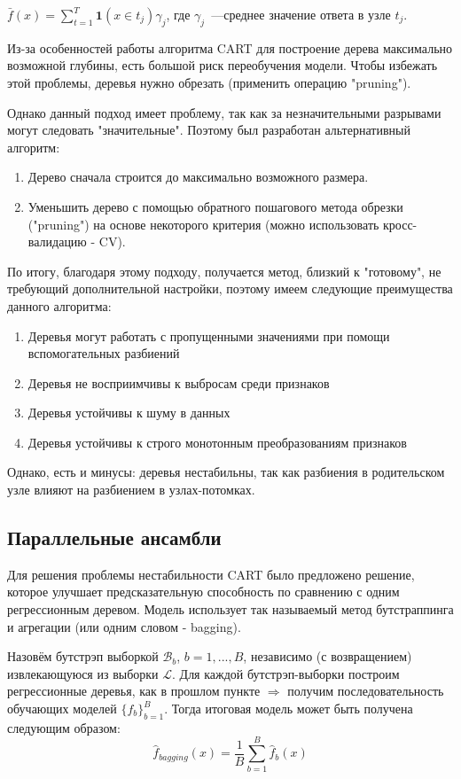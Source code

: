 \begin{center}   
$\bar{f}(x) = \sum_{t=1}^T \mathbf{1}(x \in t_j)\gamma_j$, где $\gamma_j$~---среднее значение ответа в узле $t_j$.
\end{center}

Из-за особенностей работы алгоритма CART для построение дерева максимально возможной глубины, есть большой риск переобучения модели. Чтобы избежать этой проблемы, деревья нужно обрезать (применить операцию "pruning").

Однако данный подход имеет проблему, так как за незначительными разрывами могут следовать "значительные". Поэтому был разработан альтернативный алгоритм:
\begin{enumerate}
    \item Дерево сначала строится до максимально возможного размера.
    \item Уменьшить дерево с помощью обратного пошагового метода обрезки ("pruning") на основе некоторого критерия (можно использовать кросс-валидацию - CV).
\end{enumerate}

По итогу, благодаря этому подходу, получается метод, близкий к "готовому", не требующий дополнительной настройки, поэтому имеем следующие преимущества данного алгоритма:
\begin{enumerate}
    \item Деревья могут работать с пропущенными значениями при помощи вспомогательных разбиений
    \item Деревья не восприимчивы к выбросам среди признаков
    \item Деревья устойчивы к шуму в данных
    \item Деревья устойчивы к строго монотонным преобразованиям признаков
\end{enumerate}

Однако, есть и минусы: деревья нестабильны, так как разбиения в родительском узле влияют на разбиением в узлах-потомках.

\subsection*{Параллельные ансамбли}
Для решения проблемы нестабильности CART было предложено решение, которое улучшает предсказательную способность по сравнению с одним регрессионным деревом. Модель использует так называемый метод бутстраппинга и агрегации (или одним словом - bagging). 

Назовём бутстрэп выборкой $\mathcal{B}_b$, $b=1,...,B$, независимо (с возвращением) извлекающуюся из выборки $\mathcal{L}$. Для каждой бутстрэп-выборки построим регрессионные деревья, как в прошлом пункте $\Rightarrow$ получим последовательность обучающих моделей $\{f_b\}_{b=1}^B$. Тогда итоговая модель может быть получена следующим образом:
$$\hat{f}_{bagging}(x) = \frac{1}{B}\sum_{b=1}^B \hat{f}_b(x)$$

